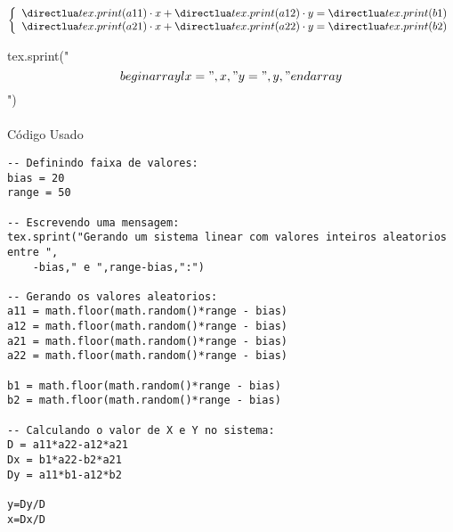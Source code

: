 \documentclass{article}
\begin{document}
\begin{equation}
\left\{
\begin{array}{l}
\printLua{a11}\cdot x + \printLua{a12} \cdot y = \printLua{b1}\\
\printLua{a21}\cdot x + \printLua{a22} \cdot y = \printLua{b2}\\
\end{array}
\right.
\end{equation}

\begin{luacode}
tex.sprint("$$\\begin{array}{l}x = ",x,"\\\\y = ",y,"\\end{array}$$")
\end{luacode}

\paragraph{}C\'odigo Usado

\begin{verbatim}
-- Definindo faixa de valores:
bias = 20
range = 50 

-- Escrevendo uma mensagem:
tex.sprint("Gerando um sistema linear com valores inteiros aleatorios entre ",
    -bias," e ",range-bias,":")

-- Gerando os valores aleatorios:
a11 = math.floor(math.random()*range - bias)
a12 = math.floor(math.random()*range - bias)
a21 = math.floor(math.random()*range - bias)
a22 = math.floor(math.random()*range - bias)

b1 = math.floor(math.random()*range - bias)
b2 = math.floor(math.random()*range - bias)

-- Calculando o valor de X e Y no sistema:
D = a11*a22-a12*a21
Dx = b1*a22-b2*a21
Dy = a11*b1-a12*b2

y=Dy/D
x=Dx/D
\end{verbatim}
\end{document}
